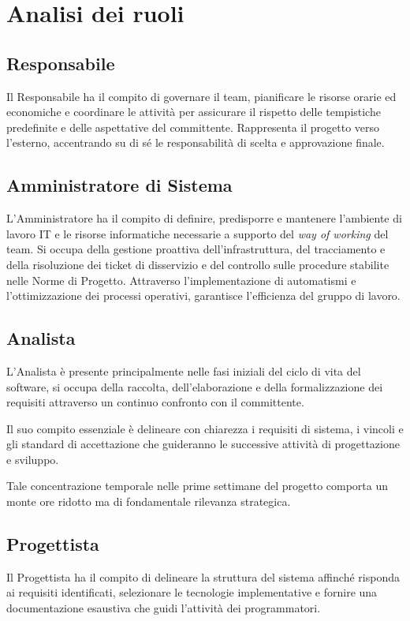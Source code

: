 \documentclass[documento]{gpt}
\begin{document}
\section{Analisi dei ruoli}
\subsection{Responsabile}
Il Responsabile ha il compito di governare il team, pianificare le risorse orarie ed economiche e coordinare le attività per assicurare il rispetto delle tempistiche predefinite e delle aspettative del committente. Rappresenta il progetto verso l'esterno, accentrando su di sé le responsabilità di scelta e approvazione finale.

\subsection{Amministratore di Sistema}
L'Amministratore ha il compito di definire, predisporre e mantenere l'ambiente di lavoro IT e le risorse informatiche necessarie a supporto del \textit{way of working} del team. Si occupa della gestione proattiva dell'infrastruttura, del tracciamento e della risoluzione dei ticket di disservizio e del controllo sulle procedure stabilite nelle Norme di Progetto. Attraverso l'implementazione di automatismi e l'ottimizzazione dei processi operativi, garantisce l'efficienza del gruppo di lavoro.

\subsection{Analista}
L'Analista è presente principalmente nelle fasi iniziali del ciclo di vita del software, si occupa della raccolta, dell'elaborazione e della formalizzazione dei requisiti attraverso un continuo confronto con il committente.

Il suo compito essenziale è delineare con chiarezza i requisiti di sistema, i vincoli e gli standard di accettazione che guideranno le successive attività di progettazione e sviluppo.

Tale concentrazione temporale nelle prime settimane del progetto comporta un monte ore ridotto ma di fondamentale rilevanza strategica.

\subsection{Progettista}
Il Progettista ha il compito di delineare la struttura del sistema affinché risponda ai requisiti identificati, selezionare le tecnologie implementative e fornire una documentazione esaustiva che guidi l'attività dei programmatori.
\end{document}
